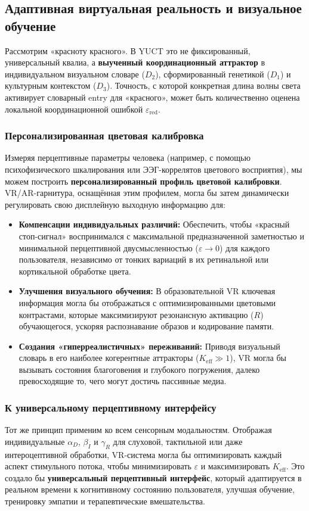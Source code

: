 \documentclass[12pt,a4paper]{article}
\begin{document}
	\subsection{Адаптивная виртуальная реальность и визуальное обучение}
	
	Рассмотрим «красноту красного». В YUCT это не фиксированный, универсальный квалиа, а \textbf{выученный координационный аттрактор} в индивидуальном визуальном словаре (\(D_2\)), сформированный генетикой (\(D_1\)) и культурным контекстом (\(D_3\)). Точность, с которой конкретная длина волны света активирует словарный entry для «красного», может быть количественно оценена локальной координационной ошибкой \(\varepsilon_{\text{red}}\).
	
	\subsubsection{Персонализированная цветовая калибровка}
	Измеряя перцептивные параметры человека (например, с помощью психофизического шкалирования или ЭЭГ-коррелятов цветового восприятия), мы можем построить \textbf{персонализированный профиль цветовой калибровки}. VR/AR-гарнитура, оснащённая этим профилем, могла бы затем динамически регулировать свою дисплейную выходную информацию для:
	\begin{itemize}
		\item \textbf{Компенсации индивидуальных различий:} Обеспечить, чтобы «красный стоп-сигнал» воспринимался с максимальной предназначенной заметностью и минимальной перцептивной двусмысленностью (\(\varepsilon \to 0\)) для каждого пользователя, независимо от тонких вариаций в их ретинальной или кортикальной обработке цвета.
		\item \textbf{Улучшения визуального обучения:} В образовательной VR ключевая информация могла бы отображаться с оптимизированными цветовыми контрастами, которые максимизируют резонансную активацию (\(R\)) обучающегося, ускоряя распознавание образов и кодирование памяти.
		\item \textbf{Создания «гиперреалистичных» переживаний:} Приводя визуальный словарь в его наиболее когерентные аттракторы (\(K_{\mathrm{eff}} \gg 1\)), VR могла бы вызывать состояния благоговения и глубокого погружения, далеко превосходящие то, чего могут достичь пассивные медиа.
	\end{itemize}
	
	\subsubsection{К универсальному перцептивному интерфейсу}
	Тот же принцип применим ко всем сенсорным модальностям. Отображая индивидуальные \(\alpha_D\), \(\beta_I\) и \(\gamma_R\) для слуховой, тактильной или даже интероцептивной обработки, VR-система могла бы оптимизировать каждый аспект стимульного потока, чтобы минимизировать \(\varepsilon\) и максимизировать \(K_{\mathrm{eff}}\). Это создало бы \textbf{универсальный перцептивный интерфейс}, который адаптируется в реальном времени к когнитивному состоянию пользователя, улучшая обучение, тренировку эмпатии и терапевтические вмешательства.
	
\end{document}
